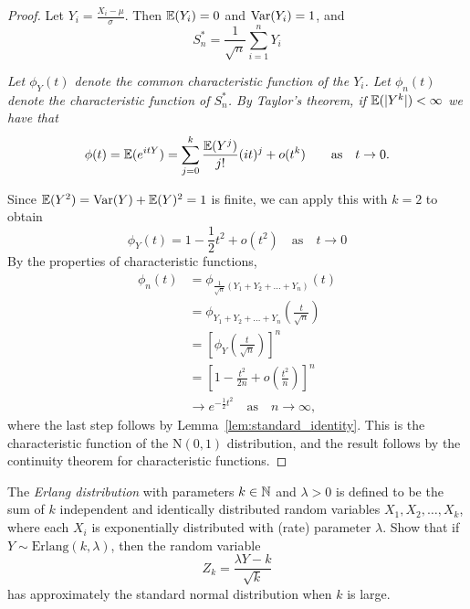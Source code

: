 \begin{proof}
Let $\displaystyle Y_i = \frac{X_i-\mu}{\sigma}$. Then $\mathbb{E}(Y_i)=0$ and $\text{Var}(Y_i)=1$, and 
\[
S^{*}_n  = \frac{1}{\sqrt{n}}\sum_{i=1}^n Y_i %
\]

\bit
\it Let $\phi_Y(t)$ denote the common characteristic function of the $Y_i$.
\it Let $\phi_n(t)$ denote the characteristic function of $S^{*}_n$.
\eit
By Taylor's theorem, if $\mathbb{E}(|Y^k|)<\infty$ we have that 
\[
\phi(t) = \mathbb{E}(e^{itY}) = \sum_{j=0}^k \frac{\mathbb{E}(Y^j)}{j!}(it)^j + o(t^k) \qquad\text{as}\quad t\to 0.
\]

Since $\mathbb{E}(Y^2) = \text{Var}(Y) + \mathbb{E}(Y)^2 = 1$ is finite, we can apply this with $k=2$ to obtain
\[
\phi_Y(t) 
	=  1 - \frac{1}{2}t^2 + o(t^2)
	\quad\text{as}\quad t\to 0
\]
By the properties of characteristic functions, 
\begin{align*}
\phi_n(t)
	& = \phi_{\frac{1}{\sqrt{n}}(Y_1+Y_2+\ldots+Y_n)}(t) \\
	& = \phi_{Y_1+Y_2+\ldots+Y_n}\left(\frac{t}{\sqrt{n}}\right) \\
	& = \left[\phi_Y\left(\frac{t}{\sqrt{n}}\right)\right]^n \\
	& = \left[1 - \frac{t^2}{2n} + o\left(\frac{t^2}{n}\right)\right]^n \\
	& \to e^{-\frac{1}{2}t^2} \quad\text{as}\quad n\to\infty,
\end{align*}
where the last step follows by Lemma~\ref{lem:standard_identity}.
This is the characteristic function of the $\text{N}(0,1)$ distribution, and the result follows by the continuity theorem for characteristic functions.
\end{proof}

\begin{example}
The \emph{Erlang distribution} with parameters $k\in\mathbb{N}$ and $\lambda>0$ is defined to be the sum of $k$ independent and identically distributed random variables $X_1,X_2,\ldots,X_k$, where each $X_i$ is exponentially distributed with (rate) parameter $\lambda$. Show that if $Y\sim\text{Erlang}(k,\lambda)$, then the random variable $$Z_k=\displaystyle\frac{\lambda Y-k}{\sqrt{k}}$$ has approximately the standard normal distribution when $k$ is large.
\end{example}

